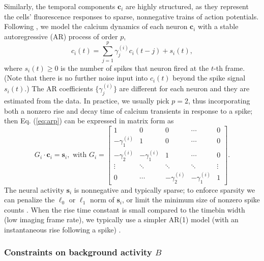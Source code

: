 \documentclass[9pt,lineno]{elife}
\begin{document}
Similarly, the temporal components $\bm{c}_i$ are highly structured, as they represent the cells' fluorescence responses to sparse, nonnegative trains of action potentials.
Following \citep{Vogelstein2010,Pnevmatikakis2016}, we model the calcium dynamics of each neuron $\bm{c}_i$ with a stable autoregressive (AR) process of order $p$,
\begin{equation}
  c_i(t) = \sum_{j=1}^p\gamma_j^{(i)} c_i(t-j)+s_i(t),  \label{eq:arp}
\end{equation}
where $s_i(t)\geq 0$ is the number of spikes that neuron fired at the $t$-th frame.  (Note that there is no further noise input into $c_i(t)$ beyond the spike signal $s_i(t)$.) The AR coefficients $\{\gamma_j^{(i)}\}$ are different for each neuron and they are estimated from the data. In practice, we usually pick $p=2$, thus incorporating both a nonzero rise and decay time of calcium transients in response to a spike; then Eq. (\ref{eq:arp}) can be expressed in matrix form as 
\begin{equation}
  G_i\cdot\bm{c}_i = \bm{s}_i, \text{ with } G_i=\begin{bmatrix}
1 &  0& 0 & \cdots &0 \\ 
-\gamma_1^{(i)}& 1 & 0 & \cdots  & 0\\ 
 -\gamma_2^{(i)}& -\gamma_1^{(i)} &1  &  \cdots& 0\\ 
\vdots  &  \ddots & \ddots &\ddots &\vdots \\ 
 0& \cdots &  -\gamma_2^{(i)}&  -\gamma_1^{(i)}&1 
\end{bmatrix}.
\label{eq:ar2}
\end{equation}
The neural activity $\bm{s}_i$ is nonnegative and typically sparse; to enforce sparsity we can
penalize the $\ell _0$ \citep{Jewell2017} or $\ell _1$ \citep{Pnevmatikakis2016,Vogelstein2010} norm of $\bm{s}_i$, or limit the minimum size of nonzero spike counts \citep{Friedrich2017}. When the rise time constant is small compared to the timebin width (low imaging frame rate), we typically use a simpler AR(1) model (with an instantaneous rise following a spike) \citep{Pnevmatikakis2016}. 

\subsubsection{Constraints on background activity \texorpdfstring{$B$}{Lg}}
\end{document}
